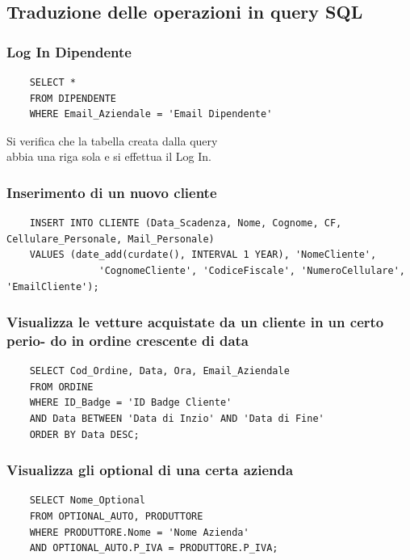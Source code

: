 \documentclass[11pt]{article}
\begin{document}
\newpage

\lstset{style=sqlStyle}

\subsection{Traduzione delle operazioni in query SQL}

\subsubsection*{Log In Dipendente}

\begin{lstlisting}
    SELECT * 
    FROM DIPENDENTE 
    WHERE Email_Aziendale = 'Email Dipendente'
\end{lstlisting}
Si verifica che la tabella creata dalla query \\
abbia una riga sola e si effettua il Log In.

\subsubsection*{Inserimento di un nuovo cliente}

\begin{lstlisting}
    INSERT INTO CLIENTE (Data_Scadenza, Nome, Cognome, CF, Cellulare_Personale, Mail_Personale)
    VALUES (date_add(curdate(), INTERVAL 1 YEAR), 'NomeCliente', 
                'CognomeCliente', 'CodiceFiscale', 'NumeroCellulare', 'EmailCliente');
\end{lstlisting}

\subsubsection*{Visualizza le vetture acquistate da un cliente in un certo
perio- do in ordine crescente di data}

\begin{lstlisting}
    SELECT Cod_Ordine, Data, Ora, Email_Aziendale 
    FROM ORDINE
    WHERE ID_Badge = 'ID Badge Cliente' 
    AND Data BETWEEN 'Data di Inzio' AND 'Data di Fine'
    ORDER BY Data DESC;
\end{lstlisting}

\subsubsection*{Visualizza gli optional di una certa azienda}
\begin{lstlisting}
    SELECT Nome_Optional
    FROM OPTIONAL_AUTO, PRODUTTORE
    WHERE PRODUTTORE.Nome = 'Nome Azienda'
    AND OPTIONAL_AUTO.P_IVA = PRODUTTORE.P_IVA;
\end{lstlisting}
\end{document}
